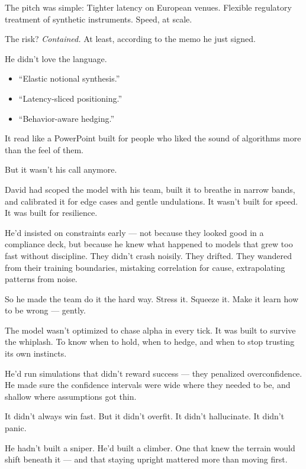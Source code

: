 The pitch was simple:
Tighter latency on European venues.
Flexible regulatory treatment of synthetic instruments.
Speed, at scale.

The risk?
\textit{Contained.} At least, according to the memo he just signed.

He didn’t love the language.

\begin{itemize}
    \item ``Elastic notional synthesis.'' 
    \item ``Latency-sliced positioning.'' 
    \item ``Behavior-aware hedging.''
\end{itemize}

It read like a PowerPoint built for people who liked the sound of algorithms more than the 
feel of them.

But it wasn’t his call anymore.

David had scoped the model with his team, built it to breathe in narrow bands, and calibrated it for edge 
cases and gentle undulations.
It wasn’t built for speed.
It was built for resilience.

He’d insisted on constraints early — not because they looked good in a compliance deck, but because 
he knew what happened to models that grew too fast without discipline. They didn’t crash noisily. 
They drifted. They wandered from their training boundaries, mistaking correlation for cause, 
extrapolating patterns from noise.

So he made the team do it the hard way.
Stress it. Squeeze it. Make it learn how to be wrong — gently.

The model wasn’t optimized to chase alpha in every tick.
It was built to survive the whiplash.
To know when to hold, when to hedge, and when to stop trusting its own instincts.

He’d run simulations that didn’t reward success — they penalized overconfidence.
He made sure the confidence intervals were wide where they needed to be, and shallow where assumptions 
got thin.

It didn’t always win fast.
But it didn’t overfit. It didn’t hallucinate. It didn’t panic.

He hadn’t built a sniper.
He’d built a climber. One that knew the terrain would shift beneath it — and that staying upright mattered 
more than moving first.

\medskip

